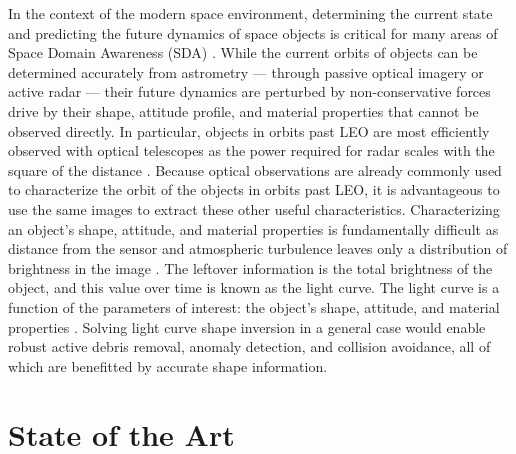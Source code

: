 In the context of the modern space environment, determining the current state and predicting the future dynamics of space objects is critical for many areas of Space Domain Awareness (SDA) \cite{frueh2019notes}. While the current orbits of objects can be determined accurately from astrometry --- through passive optical imagery or active radar --- their future dynamics are perturbed by non-conservative forces drive by their shape, attitude profile, and material properties that cannot be observed directly. In particular, objects in orbits past LEO are most efficiently observed with optical telescopes as the power required for radar scales with the square of the distance \cite{frueh2019notes}. Because optical observations are already commonly used to characterize the orbit of the objects in orbits past LEO, it is advantageous to use the same images to extract these other useful characteristics. Characterizing an object's shape, attitude, and material properties is fundamentally difficult as distance from the sensor and atmospheric turbulence leaves only a distribution of brightness in the image \cite{fan2020thesis}. The leftover information is the total brightness of the object, and this value over time is known as the light curve. The light curve is a function of the parameters of interest: the object's shape, attitude, and material properties \cite{fan2020thesis, burton2021mapping}. Solving light curve shape inversion in a general case would enable robust active debris removal, anomaly detection, and collision avoidance, all of which are benefitted by accurate shape information.

\section{State of the Art}


